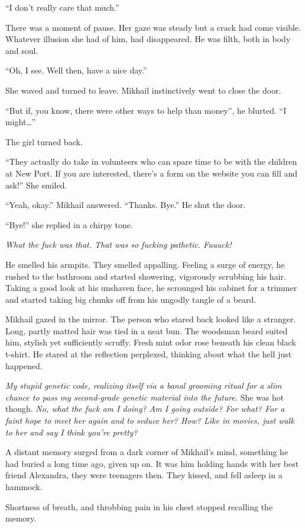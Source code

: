 “I don’t really care that much.” 

There was a moment of pause. Her gaze was steady but a crack had come visible. Whatever illusion she had of him, had disappeared. He was filth, both in body and soul.

“Oh, I see. Well then, have a nice day.”

She waved and turned to leave. Mikhail instinctively went to close the door.

“But if, you know, there were other ways to help than money”, he blurted. “I might…”

The girl turned back.

“They actually do take in volunteers who can spare time to be with the children at New Port. If you are interested, there’s a form on the website you can fill and ask!” She smiled.

“Yeah, okay.” Mikhail answered. “Thanks. Bye.” He shut the door.

“Bye!” she replied in a chirpy tone.

\textit{What the fuck was that. That was so fucking pathetic. Fuuuck!}

He smelled his armpits. They smelled appalling. Feeling a surge of energy, he rushed to the bathroom and started showering, vigorously scrubbing his hair. Taking a good look at his unshaven face, he scrounged his cabinet for a trimmer and started taking big chunks off from his ungodly tangle of a beard.

Mikhail gazed in the mirror. The person who stared back looked like a stranger. Long, partly matted hair was tied in a neat bun. The woodsman beard suited him, stylish yet sufficiently scruffy. Fresh mint odor rose beneath his clean black t-shirt. He stared at the reflection perplexed, thinking about what the hell just happened.

\textit{My stupid genetic code, realizing itself via a banal grooming ritual for a slim chance to pass my second-grade genetic material into the future.} She was hot though. \textit{No, what the fuck am I doing? Am I going outside? For what? For a faint hope to meet her again and to seduce her? How? Like in movies, just walk to her and say I think you’re pretty?}

A distant memory surged from a dark corner of Mikhail’s mind, something he had buried a long time ago, given up on. It was him holding hands with her best friend Alexandra, they were teenagers then. They kissed, and fell asleep in a hammock. 

Shortness of breath, and throbbing pain in his chest stopped recalling the memory. 


